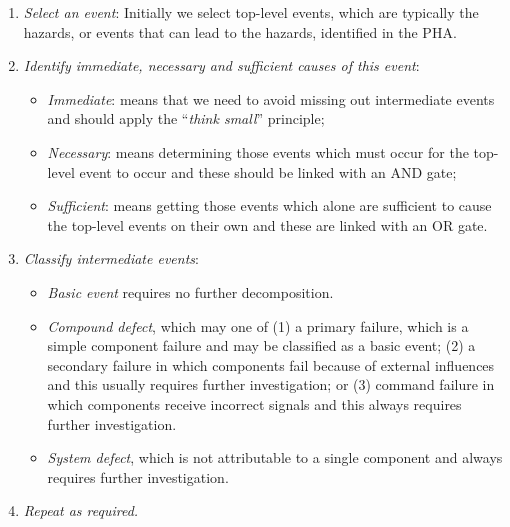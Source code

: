 \begin{enumerate}

\item \emph{Select an event}: Initially we select top-level events,  which are typically the hazards, or events that  can lead to the hazards, identified in the PHA.

\item \emph{Identify immediate, necessary and sufficient causes of this
    event}:

  \begin{itemize}

  \item \emph{Immediate}: means that we need to avoid missing out
    intermediate events and should apply the ``\emph{think small}''
    principle;

  \item \emph{Necessary}: means determining those events which must
    occur for the top-level event to occur and these should be linked
    with an AND gate;

  \item \emph{Sufficient}: means getting those events which alone are
    sufficient to cause the top-level events on their own and these are linked with
    an OR gate.

   \end{itemize}

\item \emph{Classify intermediate events}:

      \begin{itemize}

      \item \emph{Basic event} requires no further decomposition.

      \item \emph{Compound defect}, which may one of (1) a primary failure, which is a simple component failure and may be classified as a basic event; (2) a secondary failure in which components fail because of external influences and this usually requires further investigation; or (3) command failure in which components receive incorrect signals and this always requires further investigation.

     \item \emph{System defect}, which is not attributable to a single component and always requires further investigation.

\end{itemize}

 \item \emph{Repeat as required.}
\end{enumerate}


